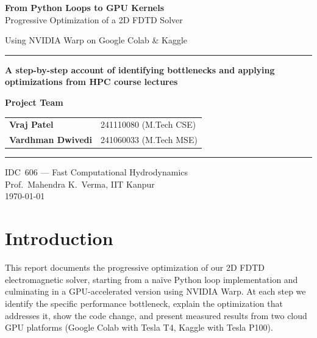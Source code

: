 \documentclass[11pt,a4paper]{article}
\begin{document}
\begin{titlepage}
\centering
\vspace*{2.5cm}

{\Huge\bfseries\color{sectioncolor} From Python Loops to GPU Kernels\\[0.3cm]}
{\LARGE\color{sectioncolor} Progressive Optimization of a 2D FDTD Solver}

\vspace{1.5cm}
{\Large Using NVIDIA Warp on Google Colab \& Kaggle}

\vspace{2.5cm}
\rule{0.7\textwidth}{0.5pt}
\vspace{0.3cm}

{\large
\textbf{A step-by-step account of identifying bottlenecks and applying}\\[0.2cm]
\textbf{optimizations from HPC course lectures}
}

\vspace{1.5cm}

{\Large\bfseries Project Team}\\[0.5cm]
{\large
\begin{tabular}{ll}
\textbf{Vraj Patel} & 241110080 \quad (M.Tech CSE) \\[4pt]
\textbf{Vardhman Dwivedi} & 241060033 \quad (M.Tech MSE) \\
\end{tabular}
}

\vspace{1cm}
\rule{0.7\textwidth}{0.5pt}

\vfill
{\large IDC~606 --- Fast Computational Hydrodynamics\\
Prof.\ Mahendra K.\ Verma, IIT Kanpur\\[0.3cm]
\today}
\end{titlepage}

\tableofcontents
\newpage


\section{Introduction}

This report documents the progressive optimization of our 2D FDTD electromagnetic solver, starting from a na\"ive Python loop implementation and culminating in a GPU-accelerated version using NVIDIA Warp. At each step we identify the specific performance bottleneck, explain the optimization that addresses it, show the code change, and present measured results from two cloud GPU platforms (Google Colab with Tesla T4, Kaggle with Tesla P100).
\end{document}
